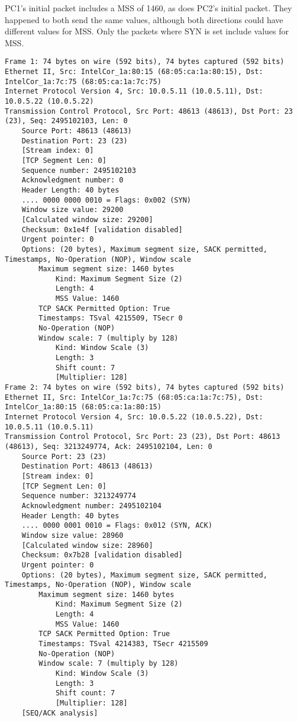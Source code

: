 PC1's initial packet includes a MSS of 1460, as does PC2's initial packet. They happened to both send the same values, although both directions could have different values for MSS. Only the packets where SYN is set include values for MSS.

\begin{lstlisting}
Frame 1: 74 bytes on wire (592 bits), 74 bytes captured (592 bits)
Ethernet II, Src: IntelCor_1a:80:15 (68:05:ca:1a:80:15), Dst: IntelCor_1a:7c:75 (68:05:ca:1a:7c:75)
Internet Protocol Version 4, Src: 10.0.5.11 (10.0.5.11), Dst: 10.0.5.22 (10.0.5.22)
Transmission Control Protocol, Src Port: 48613 (48613), Dst Port: 23 (23), Seq: 2495102103, Len: 0
    Source Port: 48613 (48613)
    Destination Port: 23 (23)
    [Stream index: 0]
    [TCP Segment Len: 0]
    Sequence number: 2495102103
    Acknowledgment number: 0
    Header Length: 40 bytes
    .... 0000 0000 0010 = Flags: 0x002 (SYN)
    Window size value: 29200
    [Calculated window size: 29200]
    Checksum: 0x1e4f [validation disabled]
    Urgent pointer: 0
    Options: (20 bytes), Maximum segment size, SACK permitted, Timestamps, No-Operation (NOP), Window scale
        Maximum segment size: 1460 bytes
            Kind: Maximum Segment Size (2)
            Length: 4
            MSS Value: 1460
        TCP SACK Permitted Option: True
        Timestamps: TSval 4215509, TSecr 0
        No-Operation (NOP)
        Window scale: 7 (multiply by 128)
            Kind: Window Scale (3)
            Length: 3
            Shift count: 7
            [Multiplier: 128]
Frame 2: 74 bytes on wire (592 bits), 74 bytes captured (592 bits)
Ethernet II, Src: IntelCor_1a:7c:75 (68:05:ca:1a:7c:75), Dst: IntelCor_1a:80:15 (68:05:ca:1a:80:15)
Internet Protocol Version 4, Src: 10.0.5.22 (10.0.5.22), Dst: 10.0.5.11 (10.0.5.11)
Transmission Control Protocol, Src Port: 23 (23), Dst Port: 48613 (48613), Seq: 3213249774, Ack: 2495102104, Len: 0
    Source Port: 23 (23)
    Destination Port: 48613 (48613)
    [Stream index: 0]
    [TCP Segment Len: 0]
    Sequence number: 3213249774
    Acknowledgment number: 2495102104
    Header Length: 40 bytes
    .... 0000 0001 0010 = Flags: 0x012 (SYN, ACK)
    Window size value: 28960
    [Calculated window size: 28960]
    Checksum: 0x7b28 [validation disabled]
    Urgent pointer: 0
    Options: (20 bytes), Maximum segment size, SACK permitted, Timestamps, No-Operation (NOP), Window scale
        Maximum segment size: 1460 bytes
            Kind: Maximum Segment Size (2)
            Length: 4
            MSS Value: 1460
        TCP SACK Permitted Option: True
        Timestamps: TSval 4214383, TSecr 4215509
        No-Operation (NOP)
        Window scale: 7 (multiply by 128)
            Kind: Window Scale (3)
            Length: 3
            Shift count: 7
            [Multiplier: 128]
    [SEQ/ACK analysis]
\end{lstlisting}

